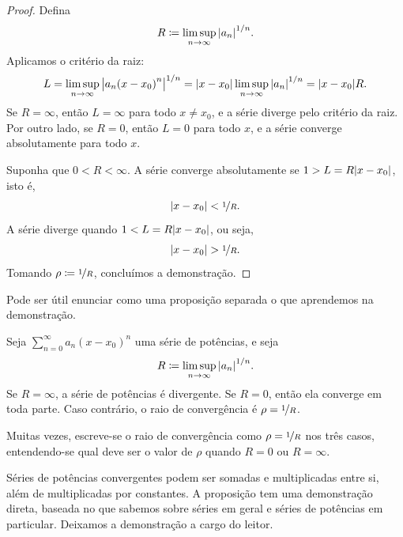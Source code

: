 \begin{proof}
Defina
\begin{equation*}
R \coloneqq \limsup_{n\to\infty} {\lvert {a_n} \rvert}^{1/n} .
\end{equation*}
Aplicamos o critério da raiz:
\begin{equation*}
L = \limsup_{n\to\infty} {\bigl\lvert {a_n {(x-x_0)}^n} \bigr\rvert}^{1/n} 
=
\lvert {x-x_0} \rvert \limsup_{n\to\infty} {\lvert {a_n} \rvert}^{1/n}
=
\lvert {x-x_0} \rvert R .
\end{equation*}
Se $R = \infty$, então $L=\infty$ para todo $x \neq x_0$, e
a série diverge pelo critério da raiz.
Por outro lado,
se $R = 0$, então $L=0$ para todo $x$,
e a série converge absolutamente para todo $x$.

Suponha que $0 < R < \infty$.
A série converge absolutamente se
$1 > L = R \lvert {x-x_0} \rvert$,
isto é,
\begin{equation*}
\lvert {x-x_0} \rvert < \nicefrac{1}{R} .
\end{equation*}
A série diverge quando
$1 < L = R \lvert {x-x_0} \rvert$,
ou seja,
\begin{equation*}
\lvert {x-x_0} \rvert > \nicefrac{1}{R} .
\end{equation*}
Tomando $\rho \coloneqq \nicefrac{1}{R}$, concluímos a demonstração.
\end{proof}

Pode ser útil enunciar como uma proposição separada
o que aprendemos na demonstração.

\begin{prop}
Seja $\sum_{n=0}^\infty a_n {(x-x_0)}^n$ uma série de potências, e seja
\begin{equation*}
R \coloneqq \limsup_{n\to\infty} {\lvert {a_n} \rvert}^{1/n} .
\end{equation*}
Se $R = \infty$, a série de potências é divergente. Se
$R=0$, então ela converge em toda parte. Caso contrário,
o raio de convergência é $\rho = \nicefrac{1}{R}$.
\end{prop}

Muitas vezes, escreve-se o raio de convergência como $\rho = \nicefrac{1}{R}$ nos
três casos, entendendo-se qual deve ser o valor de $\rho$ quando $R = 0$ ou $R =
\infty$.

\pagebreak[2]
Séries de potências convergentes podem ser somadas e multiplicadas entre si,
além de multiplicadas por constantes.
A proposição tem uma demonstração direta, baseada no que sabemos sobre séries
em geral e séries de potências em particular. Deixamos a demonstração a cargo do leitor.

